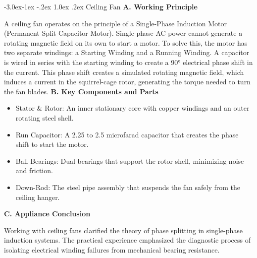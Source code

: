\documentclass[11pt,a4paper]{report}
\makeatletter
\renewcommand{\subsection}{\@startsection{subsection}{2}{\z@}%
  {-3.0ex\@plus -1ex \@minus -.2ex}%
  {1.0ex \@plus .2ex}%
  {\normalfont\large\bfseries\color{secondaryColor}}}
\makeatother
\begin{document}
\subsection{Ceiling Fan}
\noindent\textbf{A. Working Principle}\par\medskip
A ceiling fan operates on the principle of a Single-Phase Induction Motor (Permanent Split Capacitor Motor). Single-phase AC power cannot generate a rotating magnetic field on its own to start a motor. To solve this, the motor has two separate windings: a Starting Winding and a Running Winding. A capacitor is wired in series with the starting winding to create a 90° electrical phase shift in the current. This phase shift creates a simulated rotating magnetic field, which induces a current in the squirrel-cage rotor, generating the torque needed to turn the fan blades.
\noindent\textbf{B. Key Components and Parts}\par\medskip
\begin{itemize}
  \item Stator \& Rotor: An inner stationary core with copper windings and an outer rotating steel shell.
  \item Run Capacitor: A 2.25 to 2.5 microfarad capacitor that creates the phase shift to start the motor.
  \item Ball Bearings: Dual bearings that support the rotor shell, minimizing noise and friction.
  \item Down-Rod: The steel pipe assembly that suspends the fan safely from the ceiling hanger.
\end{itemize}
\noindent\textbf{C. Appliance Conclusion}\par\medskip
Working with ceiling fans clarified the theory of phase splitting in single-phase induction systems. The practical experience emphasized the diagnostic process of isolating electrical winding failures from mechanical bearing resistance.
\end{document}
